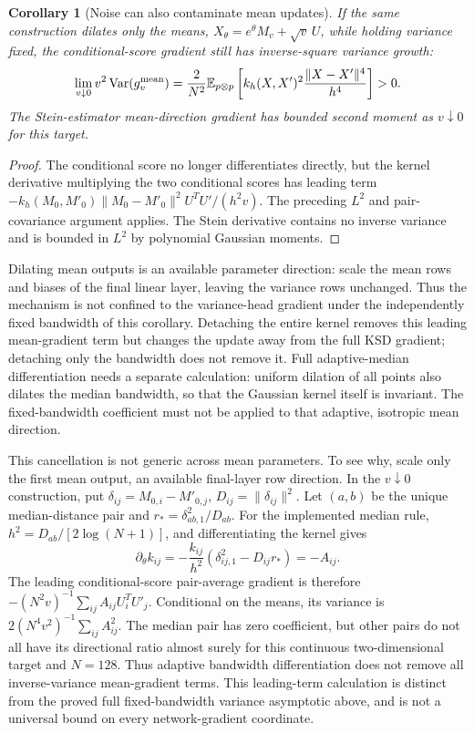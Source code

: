 \documentclass[11pt,a4paper]{article}
\newtheorem{corollary}[proposition]{Corollary}
\numberwithin{equation}{section}
\newcommand{\E}{\mathbb E}
\newcommand{\Var}{\operatorname{Var}}
\begin{document}
\begin{corollary}[Noise can also contaminate mean updates]
If the same construction dilates only the means,
$X_\theta=e^\theta M_v+\sqrt v\,U$, while holding variance fixed, the
conditional-score gradient still has inverse-square variance growth:
\[
 \lim_{v\downarrow0}v^2\Var(g^{\rm mean}_v)
 =\frac{2}{N^2}\E_{p\otimes p}
   \left[k_h(X,X')^2\frac{\|X-X'\|^4}{h^4}\right]>0.
\]
The Stein-estimator mean-direction gradient has bounded second moment as
$v\downarrow0$ for this target.
\end{corollary}
\begin{proof}
The conditional score no longer differentiates directly, but the kernel
derivative multiplying the two conditional scores has leading term
$-k_h(M_0,M'_0)\|M_0-M'_0\|^2U^TU'/(h^2v)$. The preceding $L^2$
and pair-covariance argument applies. The Stein derivative contains no
inverse variance and is bounded in $L^2$ by polynomial Gaussian moments.
\end{proof}
Dilating mean outputs is an available parameter direction: scale the mean
rows and biases of the final linear layer, leaving the variance rows
unchanged. Thus the mechanism is not confined to the variance-head gradient
under the independently fixed bandwidth of this corollary. Detaching the
entire kernel removes this leading mean-gradient term but changes the update
away from the full KSD gradient; detaching only the bandwidth does not remove
it. Full adaptive-median differentiation needs a separate calculation:
uniform dilation of all points also dilates the median bandwidth, so that
the Gaussian kernel itself is invariant. The fixed-bandwidth coefficient
must not be applied to that adaptive, isotropic mean direction.

This cancellation is not generic across mean parameters. To see why, scale
only the first mean output, an available final-layer row direction. In the
$v\downarrow0$ construction, put $\delta_{ij}=M_{0,i}-M'_{0,j}$,
$D_{ij}=\|\delta_{ij}\|^2$. Let $(a,b)$ be the unique median-distance pair
and $r_* = \delta_{ab,1}^2/D_{ab}$. For the implemented median rule,
$h^2=D_{ab}/[2\log(N+1)]$, and differentiating the kernel gives
\[
 \partial_\theta k_{ij}
 =-\frac{k_{ij}}{h^2}(\delta_{ij,1}^2-D_{ij}r_*)=-A_{ij}.
\]
The leading conditional-score pair-average gradient is therefore
$-(N^2v)^{-1}\sum_{ij}A_{ij}U_i^TU'_j$. Conditional on the means, its
variance is $2(N^4v^2)^{-1}\sum_{ij}A_{ij}^2$. The median pair has zero
coefficient, but other pairs do not all have its directional ratio almost
surely for this continuous two-dimensional target and $N=128$. Thus adaptive
bandwidth differentiation does not remove all inverse-variance mean-gradient
terms. This leading-term calculation is distinct from the proved full
fixed-bandwidth variance asymptotic above, and is not a universal bound on
every network-gradient coordinate.
\end{document}
